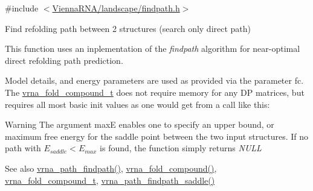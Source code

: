 {\ttfamily \#include $<$\mbox{\hyperlink{landscape_2findpath_8h}{Vienna\+R\+N\+A/landscape/findpath.\+h}}$>$}



Find refolding path between 2 structures (search only direct path) 

This function uses an inplementation of the {\itshape findpath} algorithm \cite{flamm:2001} for near-\/optimal direct refolding path prediction.

Model details, and energy parameters are used as provided via the parameter \textquotesingle{}fc\textquotesingle{}. The \mbox{\hyperlink{group__fold__compound_ga1b0cef17fd40466cef5968eaeeff6166}{vrna\+\_\+fold\+\_\+compound\+\_\+t}} does not require memory for any DP matrices, but requires all most basic init values as one would get from a call like this\+: 
\begin{DoxyCode}{0}
\end{DoxyCode}


\begin{DoxyWarning}{Warning}
The argument {\ttfamily maxE} enables one to specify an upper bound, or maximum free energy for the saddle point between the two input structures. If no path with $E_{saddle} < E_{max}$ is found, the function simply returns {\itshape N\+U\+LL} 
\end{DoxyWarning}
\begin{DoxySeeAlso}{See also}
\mbox{\hyperlink{group__paths__direct_ga2fed8ff126f5becd82cedd81a25c9bf0}{vrna\+\_\+path\+\_\+findpath()}}, \mbox{\hyperlink{group__fold__compound_ga6601d994ba32b11511b36f68b08403be}{vrna\+\_\+fold\+\_\+compound()}}, \mbox{\hyperlink{group__fold__compound_ga1b0cef17fd40466cef5968eaeeff6166}{vrna\+\_\+fold\+\_\+compound\+\_\+t}}, \mbox{\hyperlink{group__paths__direct_gad77dbfa125158f534147c0015a849bc3}{vrna\+\_\+path\+\_\+findpath\+\_\+saddle()}}
\end{DoxySeeAlso}

